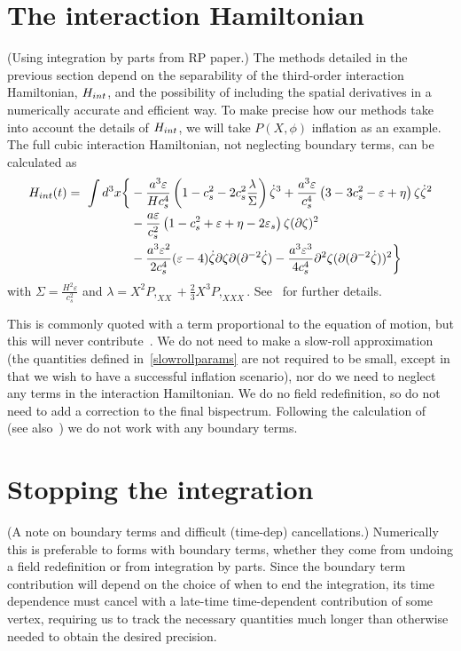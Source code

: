 \section{The interaction Hamiltonian}\label{sec:h_int}
    (Using integration by parts from RP paper.)
The methods detailed in the previous section depend on the separability of
the third-order interaction Hamiltonian, $H_{int}$,
and the possibility of including the spatial derivatives in a
numerically accurate and efficient way.
To make precise how our methods take into account the details of
$H_{int}$, we will take $P(X,\phi)$ inflation as an example.
The full cubic interaction Hamiltonian, not neglecting boundary terms,
can be calculated as~\cite{px_burrage,chen_ng_0605,seery_ng_0503}
\begin{align}
    H_{int}(t)=\ \int d^3x\bigg\{& -\frac{a^3\varepsilon}{H c_s^4}\left(1-c_s^{2}-2c_s^{2}\frac{\lambda}{\Sigma}\right)\dot{\zeta}^3
		+ \frac{a^3\varepsilon}{c_s^{4}}\left(3-3c_s^2-\varepsilon+\eta\right) \zeta\dot{\zeta}^2\nonumber\\
		&- \frac{a\varepsilon}{c_s^{2}}\left(1-c_s^2+\varepsilon+\eta-2\varepsilon_s\right) \zeta(\partial\zeta)^2\nonumber\\
        &- \frac{a^3\varepsilon^2}{2c_s^{4}}(\varepsilon-4)\dot{\zeta}\partial\zeta\partial(\partial^{-2}\dot{\zeta})
        - \frac{a^3\varepsilon^3}{4c_s^4}\partial^2\zeta(\partial(\partial^{-2}\dot{\zeta}))^2\bigg\}\label{interaction_loc}
\end{align}
with $\Sigma=\frac{H^2\varepsilon}{c^2_s}$
and $\lambda = X^2P,_{XX}+\frac{2}{3}X^3P,_{XXX}$.
See~\cite{px_burrage} for further details.


This is commonly quoted with a term proportional to the equation of motion,
but this will never contribute~\cite{px_burrage,bdy_arroja,bdy_passaglia,bdy_rigopoulos}.
We do not need to make a slow-roll approximation
(the quantities defined in~\eqref{slowrollparams} are not required to be small,
except in that we wish to have a successful inflation scenario),
nor do we need to neglect any terms in the interaction Hamiltonian.
We do no field redefinition,
so do not need to add a correction to the final bispectrum.
Following the calculation of~\cite{px_burrage} (see also~\cite{bdy_arroja,bdy_passaglia,bdy_rigopoulos})
we do not work with any boundary terms.

\section{Stopping the integration}
    (A note on boundary terms and difficult (time-dep) cancellations.)
Numerically this is preferable to forms with boundary terms,
whether they come from undoing a field redefinition or from integration by parts.
Since the boundary term contribution will depend on the choice of when to end the integration,
its time dependence must cancel with a late-time time-dependent
contribution of some vertex, requiring us to track the necessary quantities
much longer than otherwise needed to obtain the desired precision.

